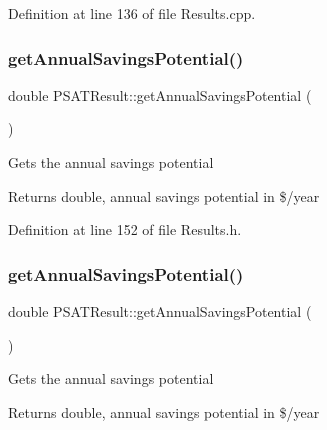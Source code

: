 Definition at line 136 of file Results.\+cpp.

\mbox{\label{class_p_s_a_t_result_ab318975db5ccdb0b7786e09a3fdff06b}} 
\subsubsection{\texorpdfstring{get\+Annual\+Savings\+Potential()}{getAnnualSavingsPotential()}\hspace{0.1cm}{\footnotesize\ttfamily [1/3]}}
{\footnotesize\ttfamily double P\+S\+A\+T\+Result\+::get\+Annual\+Savings\+Potential (\begin{DoxyParamCaption}{ }\end{DoxyParamCaption})\hspace{0.3cm}{\ttfamily [inline]}}

Gets the annual savings potential \begin{DoxyReturn}{Returns}
double, annual savings potential in \$/year 
\end{DoxyReturn}


Definition at line 152 of file Results.\+h.

\mbox{\label{class_p_s_a_t_result_ab318975db5ccdb0b7786e09a3fdff06b}} 
\subsubsection{\texorpdfstring{get\+Annual\+Savings\+Potential()}{getAnnualSavingsPotential()}\hspace{0.1cm}{\footnotesize\ttfamily [2/3]}}
{\footnotesize\ttfamily double P\+S\+A\+T\+Result\+::get\+Annual\+Savings\+Potential (\begin{DoxyParamCaption}{ }\end{DoxyParamCaption})\hspace{0.3cm}{\ttfamily [inline]}}

Gets the annual savings potential \begin{DoxyReturn}{Returns}
double, annual savings potential in \$/year 
\end{DoxyReturn}


